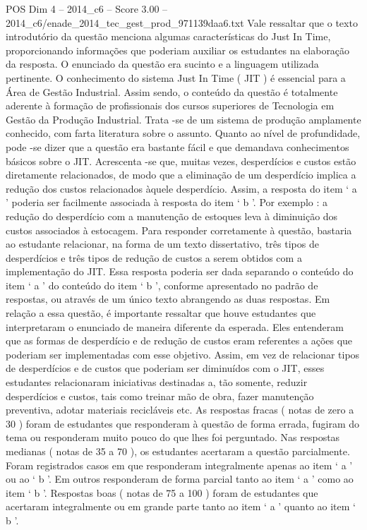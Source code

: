 \begin{textsample}{POS Dim 4 – 2014\_c6 – Score 3.00 – 2014\_c6/enade\_2014\_tec\_gest\_prod\_971139daa6.txt}
Vale ressaltar que o texto introdutório da questão menciona algumas características do Just In Time, proporcionando informações que poderiam auxiliar os estudantes na elaboração da resposta.
O enunciado da questão era sucinto e a linguagem utilizada pertinente.
O conhecimento do sistema Just In Time ( JIT ) é essencial para a Área de Gestão Industrial.
Assim sendo, o conteúdo da questão é totalmente aderente à formação de profissionais dos cursos superiores de Tecnologia em Gestão da Produção Industrial.
Trata -se de um sistema de produção amplamente conhecido, com farta literatura sobre o assunto.
Quanto ao nível de profundidade, pode -se dizer que a questão era bastante fácil e que demandava conhecimentos básicos sobre o JIT.
Acrescenta -se que, muitas vezes, desperdícios e custos estão diretamente relacionados, de modo que a eliminação de um desperdício implica a redução dos custos relacionados àquele desperdício.
Assim, a resposta do item ‘ a ’ poderia ser facilmente associada à resposta do item ‘ b ’.
Por exemplo : a redução do desperdício com a manutenção de estoques leva à diminuição dos custos associados à estocagem.
Para responder corretamente à questão, bastaria ao estudante relacionar, na forma de um texto dissertativo, três tipos de desperdícios e três tipos de redução de custos a serem obtidos com a implementação do JIT.
Essa resposta poderia ser dada separando o conteúdo do item ‘ a ’ do conteúdo do item ‘ b ’, conforme apresentado no padrão de respostas, ou através de um único texto abrangendo as duas respostas.
Em relação a essa questão, é importante ressaltar que houve estudantes que interpretaram o enunciado de maneira diferente da esperada.
Eles entenderam que as formas de desperdício e de redução de custos eram referentes a ações que poderiam ser implementadas com esse objetivo.
Assim, em vez de relacionar tipos de desperdícios e de custos que poderiam ser diminuídos com o JIT, esses estudantes relacionaram iniciativas destinadas a, tão somente, reduzir desperdícios e custos, tais como treinar mão de obra, fazer manutenção preventiva, adotar materiais recicláveis etc.
As respostas fracas ( notas de zero a 30 ) foram de estudantes que responderam à questão de forma errada, fugiram do tema ou responderam muito pouco do que lhes foi perguntado.
Nas respostas medianas ( notas de 35 a 70 ), os estudantes acertaram a questão parcialmente.
Foram registrados casos em que responderam integralmente apenas ao item ‘ a ’ ou ao ‘ b ’.
Em outros responderam de forma parcial tanto ao item ‘ a ’ como ao item ‘ b ’.
Respostas boas ( notas de 75 a 100 ) foram de estudantes que acertaram integralmente ou em grande parte tanto ao item ‘ a ’ quanto ao item ‘ b ’.

\end{textsample}
